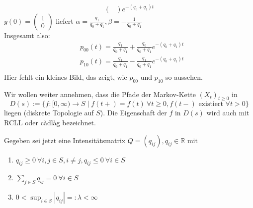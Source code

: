 \documentclass[a4paper,twoside,DIV15,BCOR12mm]{scrbook}
\begin{document}
\begin{beispiel}
\[\begin{pmatrix}
  \end{pmatrix} e^{-(q_0+q_1)t}
  \]
  $y(0)=\begin{pmatrix} 1 \\ 0\end{pmatrix}$ liefert $\alpha=\frac{q_1}{q_0+q_1},
  \beta=-\frac{1}{q_0+q_1}$ \\
  Insgesamt also:
  \begin{align*}
    & p_{00}(t)=\frac{q_1}{q_0+q_1}+\frac{q_0}{q_0+q_1}e^{-(q_0+q_1)t} \\
    & p_{10}(t)=\frac{q_1}{q_0+q_1}-\frac{q_1}{q_0+q_1}e^{-(q_0+q_1)t} \\
  \end{align*}
  Hier fehlt ein kleines Bild, das zeigt, wie $p_{00}$ und $p_{10}$ so aussehen.

  Wir wollen weiter annehmen, dass die Pfade der Markov-Kette $(X_t)_{t\geq 0}$ in
  \[
  D(s):=\{f:[0,\infty)\longrightarrow S\mid f(t+)=f(t) \ \forall t\geq0,f(t-) \text{ existiert } \forall t>0\}
  \]
  liegen (diskrete Topologie auf $S$). Die Eigenschaft der $f$ in $D(s)$ wird auch mit RCLL oder
  càdlàg bezeichnet. \\
\end{beispiel}
  Gegeben sei jetzt eine Intensitätsmatrix $Q=(q_{ij}),q_{ij}\in\mathbb R$ mit
  \begin{enumerate}[\hspace{1em}(Q1)]
\item  $q_{ij}\geq0\ \forall i,j\in S, i\neq j, q_{ij}\leq 0 \ \forall i\in S$
\item  $\sum_{j\in S}q_{ij}=0 \ \forall i\in S$
\item  $0<\sup_{i\in S}|q_{ij}|=:\lambda<\infty$
\end{enumerate}
\end{document}

